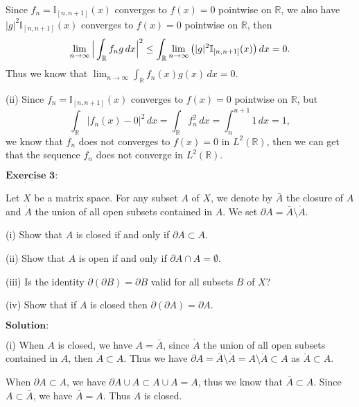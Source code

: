 \documentclass[12pt,a4paper]{ctexart}
\begin{document}
Since $f_{n} = \mathbb{I}_{[n, n+1]} (x)$ converges to $f(x) = 0$ pointwise on $\mathbb{R}$, we also have $|g|^{2} \mathbb{I}_{[n, n+1]} (x)$ converges to $f(x) = 0$ pointwise on $\mathbb{R}$, then
\begin{equation*}
    \lim_{n \to \infty} \Big{|} \int_{\mathbb{R}}^{} f_{n} g \, d x \Big{|}^{2} \leq \int_{\mathbb{R}}^{} \lim_{n \to \infty} \big{(} |g|^{2} \mathbb{I}_{[n, n+1]} (x)  \big{)} \, d x = 0.
\end{equation*}
Thus we know that $\lim_{n \to \infty} \int_{\mathbb{R}}^{} f_{n}(x) g(x) \, d x = 0$.

(ii) Since $f_{n} = \mathbb{I}_{[n, n+1]} (x)$ converges to $f(x) = 0$ pointwise on $\mathbb{R}$, but 
\begin{equation*}
    \int_{\mathbb{R}}^{} |f_{n}(x) - 0|^{2} \, d x = \int_{\mathbb{R}}^{} f_{n}^{2} \, d x = \int_{n}^{n + 1} 1 \, d x = 1,
\end{equation*}
we know that $f_{n}$ does not converges to $f(x) = 0$ in $L^{2}(\mathbb{R})$, then we can get that the sequence $f_{n}$ does not converge in $L^{2}(\mathbb{R})$.

\newpage

$\underline{\textbf{Exercise 3:}}$

Let $X$ be a matrix space. For any subset $A$ of $X$, we denote by $\bar{A}$ the closure of $A$ and $\mathring{A}$ the union of all open subsets contained in $A$. We set $\partial A = \bar{A} \setminus \mathring{A} $.

(i) Show that $A$ is closed if and only if $\partial A \subset A$.

(ii) Show that $A$ is open if and only if $\partial A \cap A = \emptyset$.

(iii) Is the identity $\partial (\partial B) = \partial B$ valid for all subsets $B$ of $X$?
  
(iv) Show that if $A$ is closed then $\partial(\partial A) = \partial A$.

\vspace{8pt}
$\textbf{Solution:}$

(i) When $A$ is closed, we have $A = \bar{A}$, since $\mathring{A}$ the union of all open subsets contained in $A$, then $\mathring{A} \subset A$. Thus we have $\partial A = \bar{A} \setminus \mathring{A} = A \setminus \mathring{A}  \subset A$ as $\mathring{A} \subset A$.

When $\partial A \subset A$, we have $\partial A \cup A \subset A \cup A = A$, thus we know that $\bar{A} \subset A$. Since $A \subset \bar{A}$, we have $\bar{A} = A$. Thus $A$ is closed.
\end{document}
